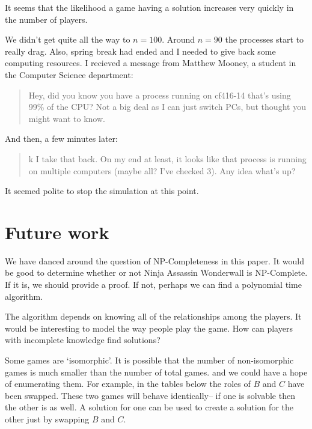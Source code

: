 \documentclass[12pt]{article}
\begin{document}
    It seems that the likelihood a game having a solution increases very quickly in the number of players.

    We didn't get quite all the way to $n=100$. Around $n=90$ the processes start to really drag. Also, spring break had ended and I needed to give back some computing resources. I recieved a message from Matthew Mooney, a student in the Computer Science department:
    \begin{quote}
    Hey, did you know you have a process running on cf416-14 that's using 99\% of the CPU? Not a big deal as I can just switch PCs, but thought you might want to know.
    \end{quote}
    And then, a few minutes later:
    \begin{quote}
    k I take that back. On my end at least, it looks like that process is running on multiple computers (maybe all? I've checked 3). Any idea what's up?
    \end{quote}

    It seemed polite to stop the simulation at this point.

\section{Future work}
    We have danced around the question of NP-Completeness in this paper. It would be good to determine whether or not Ninja Assassin Wonderwall is NP-Complete. If it is, we should provide a proof. If not, perhaps we can find a polynomial time algorithm.

    The algorithm depends on knowing all of the relationships among the players. It would be interesting to model the way people play the game. How can players with incomplete knowledge find solutions?

    Some games are `isomorphic'. It is possible that the number of non-isomorphic games is much smaller than the number of total games. and we could have a hope of enumerating them. For example, in the tables below the roles of $B$ and $C$ have been swapped. These two games will behave identically-- if one is solvable then the other is as well. A solution for one can be used to create a solution for the other just by swapping $B$ and $C$.
\end{document}
